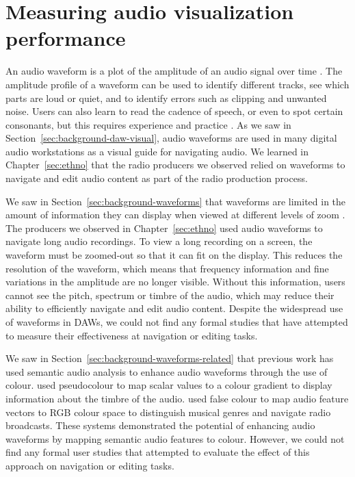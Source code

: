 \chapter{Measuring audio visualization performance}\label{sec:colourised}


An audio waveform is a plot of the amplitude of an audio signal over time \citep[p.~92]{Hausman2012}.  The amplitude
profile of a waveform can be used to identify different tracks, see which parts are loud or quiet, and to identify
errors such as clipping and unwanted noise.  Users can also learn to read the cadence of speech, or even to spot
certain consonants, but this requires experience and practice \citep[p.~115]{Hausman2012}.  As we saw in
Section~\ref{sec:background-daw-visual}, audio waveforms are used in many digital audio workstations as a visual guide
for navigating audio. We learned in Chapter~\ref{sec:ethno} that the radio producers we observed relied on
waveforms to navigate and edit audio content as part of the radio production process.

We saw in Section~\ref{sec:background-waveforms} that waveforms are limited in the amount of information they can
display when viewed at different levels of zoom \citep{Loviscach2011}.  The producers we observed in
Chapter~\ref{sec:ethno} used audio waveforms to navigate long audio recordings. To view a long recording on a screen,
the waveform must be zoomed-out so that it can fit on the display.  This reduces the resolution of the waveform, which
means that frequency information and fine variations in the amplitude are no longer visible.  Without this information,
users cannot see the pitch, spectrum or timbre of the audio, which may reduce their ability to efficiently navigate and
edit audio content.  Despite the widespread use of waveforms in DAWs, we could not find any formal studies that have
attempted to measure their effectiveness at navigation or editing tasks.

We saw in Section~\ref{sec:background-waveforms-related} that previous work has used semantic audio analysis to enhance
audio waveforms through the use of colour.  \citet{Rice2005,Akkermans2011,Loviscach2011a} used pseudocolour to map
scalar values to a colour gradient to display information about the timbre of the audio.
\citet{Tzanetakis2000,Mason2007} used false colour to map audio feature vectors to RGB colour space to distinguish
musical genres and navigate radio broadcasts.  These systems demonstrated the potential of enhancing audio waveforms by
mapping semantic audio features to colour. However, we could not find any formal user studies that attempted to
evaluate the effect of this approach on navigation or editing tasks.


